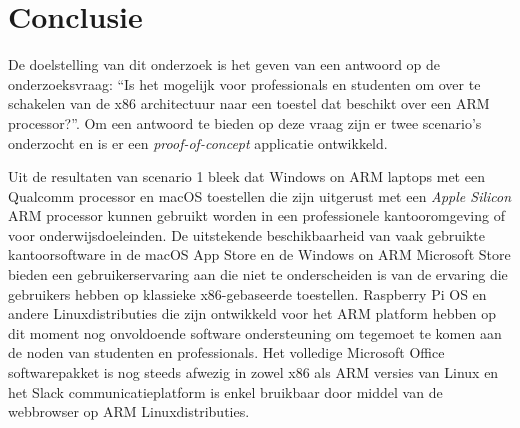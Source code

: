 
\chapter{Conclusie}
\label{ch:conclusie}


De doelstelling van dit onderzoek is het geven van een antwoord op de onderzoeksvraag: “Is het mogelijk voor professionals en studenten om over te schakelen van de x86 architectuur naar een toestel dat beschikt over een ARM processor?”. Om een antwoord te bieden op deze vraag zijn er twee scenario’s onderzocht en is er een \textit{proof-of-concept} applicatie ontwikkeld.

Uit de resultaten van scenario 1 bleek dat Windows on ARM laptops met een Qualcomm processor en macOS toestellen die zijn uitgerust met een \textit{Apple Silicon} ARM processor kunnen gebruikt worden in een professionele kantooromgeving of voor onderwijsdoeleinden. De uitstekende beschikbaarheid van vaak gebruikte kantoorsoftware in de macOS App Store en de Windows on ARM Microsoft Store bieden een gebruikerservaring aan die niet te onderscheiden is van de ervaring die gebruikers hebben op klassieke x86-gebaseerde toestellen. Raspberry Pi OS en andere Linuxdistributies die zijn ontwikkeld voor het ARM platform hebben op dit moment nog onvoldoende software ondersteuning om tegemoet te komen aan de noden van studenten en professionals. Het volledige Microsoft Office softwarepakket is nog steeds afwezig in zowel x86 als ARM versies van Linux en het Slack communicatieplatform is enkel bruikbaar door middel van de webbrowser op ARM Linuxdistributies.

